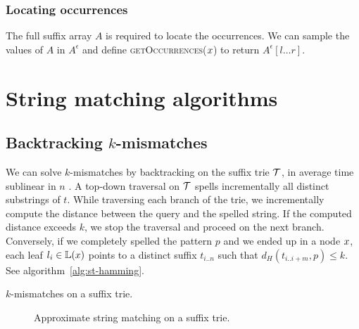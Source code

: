 \subsubsection{Locating occurrences}

The full suffix array $A$ is required to locate the occurrences.
We can sample the values of $A$ in $A^{\epsilon}$ and define \textsc{getOccurrences}($x$) to return $A^{\epsilon}[l \dots r]$.

\section{String matching algorithms}

\subsection{Backtracking $k$-mismatches}

We can solve $k$-mismatches by backtracking \citep{Ukkonen1993, Baeza1999} on the suffix trie $\mathcal {T}$, in average time sublinear in $n$ \citep{Navarro2000}.
A top-down traversal on $\mathcal {T}$ spells incrementally all distinct substrings of $t$.
While traversing each branch of the trie, we incrementally compute the distance between the query and the spelled string.
If the computed distance exceeds $k$, we stop the traversal and proceed on the next branch.
Conversely, if we completely spelled the pattern $p$ and we ended up in a node $x$, each leaf $l_i \in \mathbb {L}(x)$ points to a distinct suffix $t_{i..n}$ such that $d_H(t_{i..i+m}, p) \leq k$.
See algorithm~\ref{alg:st-hamming}.

\begin{algorithm}[h]
\caption{$k$-mismatches on a suffix trie.}
\label{alg:st-hamming}
\begin{algorithmic}[1]
			\State \Report {}
			\Repeat
				\State {}
				\State {}
				\State {}
			\Until {}
		\EndIf
	\EndIf
\EndProcedure
\end{algorithmic}
\end{algorithm}

\begin{figure}[h]
\begin{center}
\caption{Approximate string matching on a suffix trie.}
\label{fig:st-hamming}

\end{center}
\end{figure}



